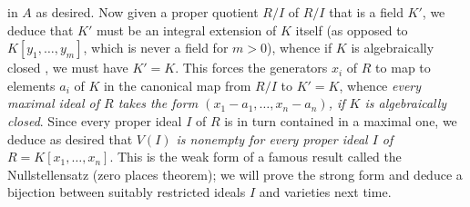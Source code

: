 \documentclass[10pt]{article}
\begin{document}
in $A$ as desired. Now given a proper quotient $R/I$ of $R/I$ that is a
field $K'$, we deduce that $K'$ must be an integral extension of $K$
itself (as opposed to $K[y_1,\ldots,y_m]$, which is never a field for
$m>0$), whence if $K$ is algebraically closed , we must have $K'=K$.
This forces the generators $x_i$ of $R$ to map to elements $a_i$ of $K$
in the canonical map from $R/I$ to $K'=K$, whence {\sl every maximal
  ideal of $R$ takes the form $(x_1-a_1,\ldots,x_n-a_n)$, if $K$ is
  algebraically closed}. Since every proper ideal $I$ of $R$ is in turn
contained in a maximal one, we deduce as desired that {\sl$V(I)$ is
  nonempty for every proper ideal $I$ of $R=K[x_1,\ldots,x_n]$}. This is
the weak form of a famous result called the Nullstellensatz (zero places
theorem); we will prove the strong form and deduce a bijection between
suitably restricted ideals $I$ and varieties next time.
\end{document}
